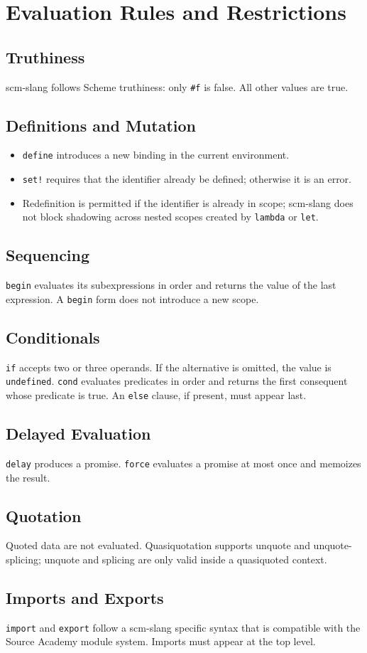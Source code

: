 \section{Evaluation Rules and Restrictions}

\subsection*{Truthiness}
scm-slang follows Scheme truthiness: only \texttt{\#f} is false. All other
values are true.

\subsection*{Definitions and Mutation}
\begin{itemize}
\item \texttt{define} introduces a new binding in the current environment.
\item \texttt{set!} requires that the identifier already be defined; otherwise
      it is an error.
\item Redefinition is permitted if the identifier is already in scope; scm-slang
      does not block shadowing across nested scopes created by \texttt{lambda} or
      \texttt{let}.
\end{itemize}

\subsection*{Sequencing}
\texttt{begin} evaluates its subexpressions in order and returns the value of the
last expression. A \texttt{begin} form does not introduce a new scope.

\subsection*{Conditionals}
\texttt{if} accepts two or three operands. If the alternative is omitted, the
value is \texttt{undefined}. \texttt{cond} evaluates predicates in order and
returns the first consequent whose predicate is true. An \texttt{else} clause, if
present, must appear last.

\subsection*{Delayed Evaluation}
\texttt{delay} produces a promise. \texttt{force} evaluates a promise at most once
and memoizes the result.

\subsection*{Quotation}
Quoted data are not evaluated. Quasiquotation supports unquote and
unquote-splicing; unquote and splicing are only valid inside a quasiquoted
context.

\subsection*{Imports and Exports}
\texttt{import} and \texttt{export} follow a scm-slang specific syntax that is
compatible with the Source Academy module system. Imports must appear at the
top level.

